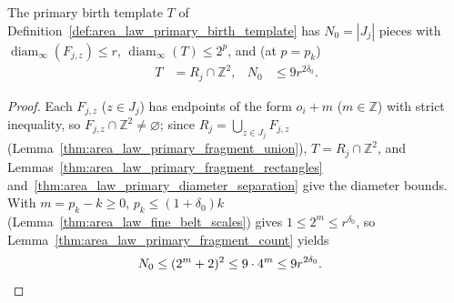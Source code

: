 \begin{lemma}
    \label{thm:area_law_primary_birth_template_points}
    \leanok
    The primary birth template $T$ of Definition~\ref{def:area_law_primary_birth_template}
    has $N_0=|J_j|$ pieces with $\operatorname{diam}_\infty(F_{j,z})\le r$,
    $\operatorname{diam}_\infty(T)\le 2^p$, and (at $p=p_k$)
    \begin{align}
        T   & =R_j\cap\mathbb Z^2, &
        N_0 & \le 9r^{2\delta_0}.
        \label{eq:area_law_primary_birth_points_count}
    \end{align}
\end{lemma}
\begin{proof}\leanok
    Each $F_{j,z}$ ($z\in J_j$) has endpoints of the form $o_i+m$ ($m\in\mathbb Z$)
    with strict inequality, so $F_{j,z}\cap\mathbb Z^2\ne\varnothing$; since
    $R_j=\bigcup_{z\in J_j}F_{j,z}$ (Lemma~\ref{thm:area_law_primary_fragment_union}),
    $T=R_j\cap\mathbb Z^2$, and Lemmas~\ref{thm:area_law_primary_fragment_rectangles}
    and~\ref{thm:area_law_primary_diameter_separation} give the diameter bounds.
    With $m=p_k-k\ge0$, $p_k\le(1+\delta_0)k$
    (Lemma~\ref{thm:area_law_fine_belt_scales}) gives $1\le 2^m\le r^{\delta_0}$,
    so Lemma~\ref{thm:area_law_primary_fragment_count} yields
    \begin{align}
        N_0 & \le(2^m+2)^2\le9\cdot4^m\le9r^{2\delta_0}.
        \notag
    \end{align}
\end{proof}

